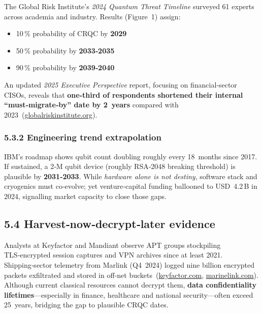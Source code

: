 \documentclass[
  english,
]{article}
\providecommand{\tightlist}{%
  \setlength{\itemsep}{0pt}\setlength{\parskip}{0pt}}
\begin{document}
The Global Risk Institute's \emph{2024 Quantum Threat Timeline} surveyed
61 experts across academia and industry. Results (Figure~1) assign:

\begin{itemize}
\tightlist
\item
  10\,\% probability of CRQC by \textbf{2029}
\item
  50\,\% probability by \textbf{2033‑2035}
\item
  90\,\% probability by \textbf{2039‑2040}
\end{itemize}

An updated \emph{2025 Executive Perspective} report, focusing on
financial‑sector CISOs, reveals that \textbf{one‑third of respondents
shortened their internal ``must‑migrate‑by'' date by 2~years} compared
with
2023~(\href{https://globalriskinstitute.org/publication/quantum-threat-timeline-2025-executive-perspectives-on-barriers-to-action/?utm_source=chatgpt.com}{globalriskinstitute.org}).

\subsubsection{5.3.2 Engineering trend
extrapolation}\label{engineering-trend-extrapolation}

IBM's roadmap shows qubit count doubling roughly every 18~months since
2017. If sustained, a 2‑M qubit device (roughly RSA‑2048 breaking
threshold) is plausible by \textbf{2031‑2033}. While \emph{hardware
alone is not destiny}, software stack and cryogenics must co‑evolve; yet
venture‑capital funding ballooned to USD~4.2\,B in 2024, signalling
market capacity to close those gaps.

\subsection{5.4 Harvest‑now‑decrypt‑later
evidence}\label{harvestnowdecryptlater-evidence}

Analysts at Keyfactor and Mandiant observe APT groups stockpiling
TLS‑encrypted session captures and VPN archives since at least 2021.
Shipping‑sector telemetry from Marlink (Q4~2024) logged nine billion
encrypted packets exfiltrated and stored in off‑net
buckets~(\href{https://www.keyfactor.com/blog/harvest-now-decrypt-later-a-new-form-of-attack/?utm_source=chatgpt.com}{keyfactor.com},
\href{https://www.marinelink.com/news/harvest-decrypt-later-526089?utm_source=chatgpt.com}{marinelink.com}).
Although current classical resources cannot decrypt them, \textbf{data
confidentiality lifetimes}---especially in finance, healthcare and
national security---often exceed 25~years, bridging the gap to plausible
CRQC dates.
\end{document}
